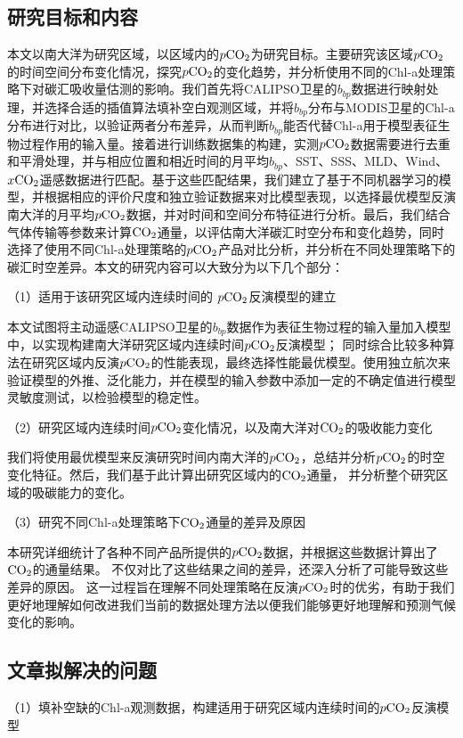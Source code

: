 \subsection{研究目标和内容}
本文以南大洋为研究区域，以区域内的$p\rm CO_2$为研究目标。主要研究该区域$p\rm CO_2$的时间空间分布变化情况，探究$p\rm CO_2$的变化趋势，并分析使用不同的Chl-a处理策略下对碳汇吸收量估测的影响。我们首先将CALIPSO卫星的$b_{bp}$数据进行映射处理，并选择合适的插值算法填补空白观测区域，并将$b_{bp}$分布与MODIS卫星的Chl-a分布进行对比，以验证两者分布差异，从而判断$b_{bp}$能否代替Chl-a用于模型表征生物过程作用的输入量。接着进行训练数据集的构建，实测$p\rm CO_2$数据需要进行去重和平滑处理，并与相应位置和相近时间的月平均$b_{bp}$、SST、SSS、MLD、Wind、$x\rm CO_2$遥感数据进行匹配。基于这些匹配结果，我们建立了基于不同机器学习的模型，并根据相应的评价尺度和独立验证数据来对比模型表现，以选择最优模型反演南大洋的月平均$p\rm CO_2$数据，并对时间和空间分布特征进行分析。最后，我们结合气体传输等参数来计算$\rm CO_2$通量，以评估南大洋碳汇时空分布和变化趋势，同时选择了使用不同Chl-a处理策略的$p\rm CO_2$产品对比分析，并分析在不同处理策略下的碳汇时空差异。本文的研究内容可以大致分为以下几个部分：

（1）适用于该研究区域内连续时间的 $p\rm CO_2$反演模型的建立

本文试图将主动遥感CALIPSO卫星的$b_{bp}$数据作为表征生物过程的输入量加入模型中，以实现构建南大洋研究区域内连续时间$p\rm CO_2$反演模型；
同时综合比较多种算法在研究区域内反演$p\rm CO_2$的性能表现，最终选择性能最优模型。使用独立航次来验证模型的外推、泛化能力，并在模型的输入参数中添加一定的不确定值进行模型灵敏度测试，以检验模型的稳定性。

（2）研究区域内连续时间$p\rm CO_2$变化情况，以及南大洋对$\rm CO_2$的吸收能力变化

我们将使用最优模型来反演研究时间内南大洋的$p\rm CO_2$，总结并分析$p\rm CO_2$的时空变化特征。然后，我们基于此计算出研究区域内的$\rm CO_2$通量，
并分析整个研究区域的吸碳能力的变化。

（3）研究不同Chl-a处理策略下$\rm CO_2$通量的差异及原因

本研究详细统计了各种不同产品所提供的$p\rm CO_2$数据，并根据这些数据计算出了$\rm CO_2$的通量结果。
不仅对比了这些结果之间的差异，还深入分析了可能导致这些差异的原因。
这一过程旨在理解不同处理策略在反演$p\rm CO_2$时的优劣，有助于我们更好地理解如何改进我们当前的数据处理方法以便我们能够更好地理解和预测气候变化的影响。

\subsection{文章拟解决的问题}
（1）填补空缺的Chl-a观测数据，构建适用于研究区域内连续时间的$p\rm CO_2$反演模型

